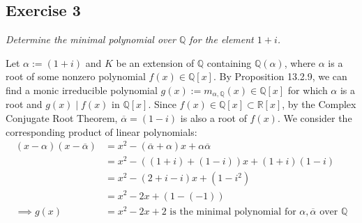 \subsection*{Exercise 3}
\begin{framed}
\textit{Determine the minimal polynomial over $\mathbb{Q}$ for the element $1 + i$.}
\end{framed}

Let $\alpha := (1 + i)$ and $K$ be an extension of $\mathbb{Q}$ containing $\mathbb{Q}(\alpha)$, where $\alpha$ is a root of some nonzero polynomial $f(x) \in \mathbb{Q}[x]$. By Proposition 13.2.9, we can find a monic irreducible polynomial $g(x) := m_{\alpha, \mathbb{Q}}(x) \in \mathbb{Q}[x]$ for which $\alpha$ is a root and $g(x) \mid f(x)$ in $\mathbb{Q}[x]$. Since $f(x) \in \mathbb{Q}[x] \subset \mathbb{R}[x]$, by the Complex Conjugate Root Theorem, $\overline{\alpha} = (1 - i)$ is also a root of $f(x)$. We consider the corresponding product of linear polynomials: 
\begin{align*}
    (x - \alpha)(x - \overline{\alpha}) &= x^2 - (\overline{\alpha} + \alpha)x + \alpha\overline{\alpha} \\
    &= x^2 - ((1 + i) + (1 - i))x + (1 + i)(1 - i) \\
    &= x^2 - (2 + i - i)x + (1 - i^2) \\
    &= x^2 - 2x + (1 - (-1)) \\
    \implies g(x) &= x^2 - 2x + 2 \text{ is the minimal polynomial for $\alpha, \overline{\alpha}$ over } \mathbb{Q}
\end{align*}